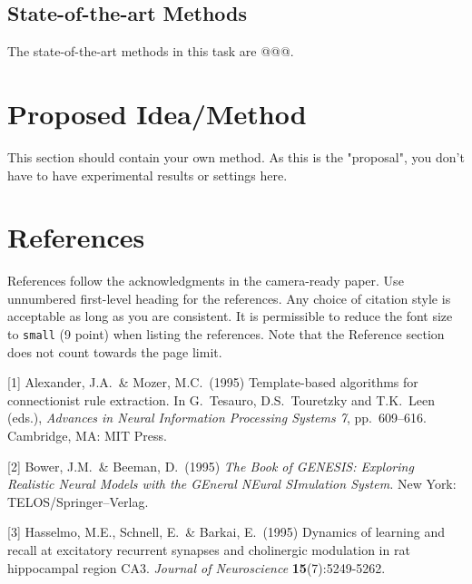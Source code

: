 \documentclass{article}
\begin{document}
\subsection{State-of-the-art Methods}
The state-of-the-art methods in this task are @@@.

\section{Proposed Idea/Method}
This section should contain your own method.
As this is the "proposal", you don't have to have experimental results or settings here.




\newpage
\section*{References}


References follow the acknowledgments in the camera-ready paper. Use unnumbered first-level heading for
the references. Any choice of citation style is acceptable as long as you are
consistent. It is permissible to reduce the font size to \verb+small+ (9 point)
when listing the references.
Note that the Reference section does not count towards the page limit.
\medskip


{
\small


[1] Alexander, J.A.\ \& Mozer, M.C.\ (1995) Template-based algorithms for
connectionist rule extraction. In G.\ Tesauro, D.S.\ Touretzky and T.K.\ Leen
(eds.), {\it Advances in Neural Information Processing Systems 7},
pp.\ 609--616. Cambridge, MA: MIT Press.


[2] Bower, J.M.\ \& Beeman, D.\ (1995) {\it The Book of GENESIS: Exploring
  Realistic Neural Models with the GEneral NEural SImulation System.}  New York:
TELOS/Springer--Verlag.


[3] Hasselmo, M.E., Schnell, E.\ \& Barkai, E.\ (1995) Dynamics of learning and
recall at excitatory recurrent synapses and cholinergic modulation in rat
hippocampal region CA3. {\it Journal of Neuroscience} {\bf 15}(7):5249-5262.
}

\end{document}
